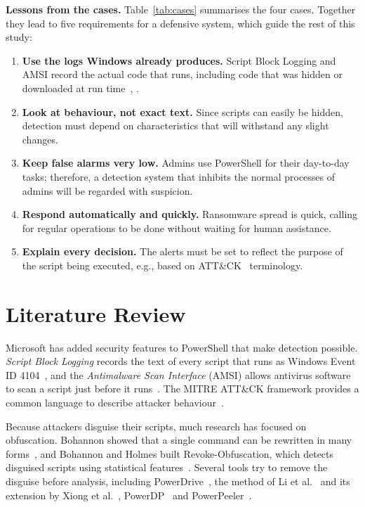 \documentclass[12pt,a4paper]{article}
\newcommand{\attck}{ATT\&CK}
\newcommand{\head}[1]{\noindent\textbf{#1}\quad}
\begin{document}
\head{Lessons from the cases.} Table~\ref{tab:cases} summarises the four cases. Together they lead to five requirements for a defensive system, which guide the rest of this study:
\begin{enumerate}
  \item \textbf{Use the logs Windows already produces.} Script Block Logging and AMSI record the actual code that runs, including code that was hidden or downloaded at run time~\cite{ms_logging}, \cite{ms_amsi}.
  \item \textbf{Look at behaviour, not exact text.} Since scripts can easily be hidden, detection must depend on characteristics that will withstand any slight changes.
  \item \textbf{Keep false alarms very low.} Admins use PowerShell for their day-to-day tasks; therefore, a detection system that inhibits the normal processes of admins will be regarded with suspicion.
  \item \textbf{Respond automatically and quickly.} Ransomware spread is quick, calling for regular operations to be done without waiting for human assistance.
  \item \textbf{Explain every decision.} The alerts must be set to reflect the purpose of the script being executed, e.g., based on \attck{}~\cite{strom2018} terminology.
\end{enumerate}

\section{Literature Review}
Microsoft has added security features to PowerShell that make detection possible. \emph{Script Block Logging} records the text of every script that runs as Windows Event ID 4104~\cite{ms_logging}, and the \emph{Antimalware Scan Interface} (AMSI) allows antivirus software to scan a script just before it runs~\cite{ms_amsi}. The MITRE \attck{} framework provides a common language to describe attacker behaviour~\cite{strom2018}.

Because attackers disguise their scripts, much research has focused on obfuscation. Bohannon showed that a single command can be rewritten in many forms~\cite{bohannon2016}, and Bohannon and Holmes built Revoke-Obfuscation, which detects disguised scripts using statistical features~\cite{bohannon2017}. Several tools try to remove the disguise before analysis, including PowerDrive~\cite{ugarte2019}, the method of Li et al.~\cite{li2019} and its extension by Xiong et al.~\cite{xiong2022}, PowerDP~\cite{tsai2023} and PowerPeeler~\cite{li2024}.
\end{document}
